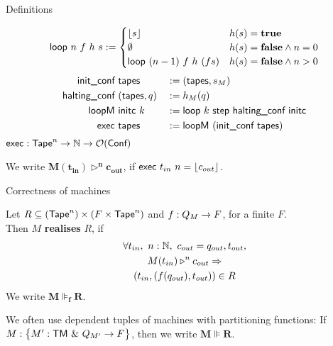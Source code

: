 \begin{frame}{Definitions}
  \begin{definition}[Execution]
    \begin{align*}
      \textsf{loop}~n~f~h~s :=
      \begin{cases}
        \left\lfloor {s}\right\rfloor              & h(s) = \mathbf{true} \\
        \emptyset                 & h(s) = \mathbf{false} \land n = 0 \\
        \textsf{loop}~(n-1)~f~h~(f s)  & h(s) = \mathbf{false} \land n > 0
      \end{cases}
    \end{align*}
    \pause%
    \begin{alignat*}{3}
      \textsf{init\_conf}    &~\textsf{tapes}      &&:= (\textsf{tapes}, s_M) \\
      \textsf{halting\_conf} &~(\textsf{tapes}, q) &&:= h_M(q) \\
      \textsf{loopM}         &~\textsf{initc}~k    &&:= \textsf{loop}~k~\textsf{step}~\textsf{halting\_conf}~\textsf{initc} \\
      \textsf{exec}          &~\textsf{tapes}      &&:= \textsf{loopM}~(\textsf{init\_conf}~\textsf{tapes})
    \end{alignat*}
    {
      \small
      $\textsf{exec} : \textsf{Tape}^n \rightarrow \mathbb{N} \rightarrow \mathcal{O}(\textsf{Conf})$
    }
  \end{definition}

  \pause%
  We write $\mathbf{M(t_{in}) \triangleright^n c_{out}}$, if $\textsf{exec}~t_{in}~n= \left\lfloor {c_{out}}\right\rfloor$.
\end{frame}

\begin{frame}{Correctness of machines}
  \begin{definition}
    Let $R \subseteq (\textsf{Tape}^n) \times (F \times \textsf{Tape}^n)$ and $f : Q_M \rightarrow F$, for a finite $F$.\\
    Then $M$ \textbf{realises} $R$, if
    \begin{multline*}
      \forall t_{in},~n:\mathbb{N},~c_{out}={q_{out}, t_{out}}, \\
      M(t_{in}) \triangleright^n c_{out} \Rightarrow \\
      \left(t_{in}, \left(f(q_{out}), t_{out} \right) \right) \in R
    \end{multline*}
    We write $\mathbf{M \VDash_f R}$.
  \end{definition}
  \pause%
  We often use dependent tuples of machines with partitioning functions:
  If $M : \bigl\{ M' : \textsf{TM}~{\&}~Q_{M'} \rightarrow F \bigr \}$, then we write $\mathbf{M \VDash R}$.
\end{frame}

